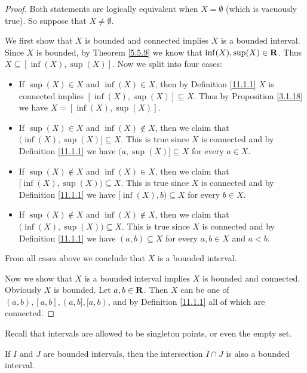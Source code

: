 \begin{proof}
    Both statements are logically equivalent when \(X = \emptyset\) (which is vacuously true).
    So suppose that \(X \neq \emptyset\).

    We first show that \(X\) is bounded and connected implies \(X\) is a bounded interval.
    Since \(X\) is bounded, by Theorem \ref{5.5.9} we know that \(\inf(X), \sup(X) \in \mathbf{R}\).
    Thus \(X \subseteq [\inf(X), \sup(X)]\).
    Now we split into four cases:
    \begin{itemize}
        \item If \(\sup(X) \in X\) and \(\inf(X) \in X\), then by Definition \ref{11.1.1} \(X\) is connected implies \([\inf(X), \sup(X)] \subseteq X\).
              Thus by Proposition \ref{3.1.18} we have \(X = [\inf(X), \sup(X)]\).
        \item If \(\sup(X) \in X\) and \(\inf(X) \notin X\), then we claim that \(\big(\inf(X), \sup(X)] \subseteq X\).
              This is true since \(X\) is connected and by Definition \ref{11.1.1} we have \(\big(a, \sup(X)] \subseteq X\) for every \(a \in X\).
        \item If \(\sup(X) \notin X\) and \(\inf(X) \in X\), then we claim that \([\inf(X), \sup(X)\big) \subseteq X\).
              This is true since \(X\) is connected and by Definition \ref{11.1.1} we have \([\inf(X), b\big) \subseteq X\) for every \(b \in X\).
        \item If \(\sup(X) \notin X\) and \(\inf(X) \notin X\), then we claim that \(\big(\inf(X), \sup(X)\big) \subseteq X\).
              This is true since \(X\) is connected and by Definition \ref{11.1.1} we have \((a, b) \subseteq X\) for every \(a, b \in X\) and \(a < b\).
    \end{itemize}
    From all cases above we conclude that \(X\) is a bounded interval.

    Now we show that \(X\) is a bounded interval implies \(X\) is bounded and connected.
    Obviously \(X\) is bounded.
    Let \(a, b \in \mathbf{R}\).
    Then \(X\) can be one of \((a, b), [a, b], (a, b], [a, b)\), and by Definition \ref{11.1.1} all of which are connected.
\end{proof}

\begin{remark}\label{11.1.5}
    Recall that intervals are allowed to be singleton points, or even the empty set.
\end{remark}

\begin{corollary}\label{11.1.6}
    If \(I\) and \(J\) are bounded intervals, then the intersection \(I \cap J\) is also a bounded interval.
\end{corollary}

